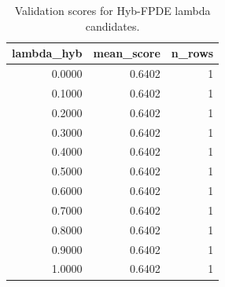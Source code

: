 \begin{table}[t]
\caption{Validation scores for Hyb-FPDE lambda candidates.}
\label{tab:lambda_distribution_computed}
\centering
\begin{tabular}{rrr}
\toprule
lambda\_hyb & mean\_score & n\_rows \\
\midrule
0.0000 & 0.6402 & 1 \\
0.1000 & 0.6402 & 1 \\
0.2000 & 0.6402 & 1 \\
0.3000 & 0.6402 & 1 \\
0.4000 & 0.6402 & 1 \\
0.5000 & 0.6402 & 1 \\
0.6000 & 0.6402 & 1 \\
0.7000 & 0.6402 & 1 \\
0.8000 & 0.6402 & 1 \\
0.9000 & 0.6402 & 1 \\
1.0000 & 0.6402 & 1 \\
\bottomrule
\end{tabular}

\end{table}
